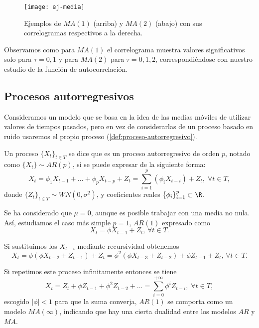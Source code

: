 \begin{figure}[htpb]
  \centering
  \texttt{[image: ej-media]}
  \caption{Ejemplos de $MA(1)$ (arriba) y $MA(2)$ (abajo) con sus correlogramas respectivos a la derecha.}
  \label{fig:ej-media}
\end{figure}

Observamos como para $MA(1)$ el correlograma muestra valores significativos solo para $\tau = 0, 1$ y para $MA(2)$ para $\tau = 0, 1, 2$, correspondiéndose con nuestro estudio de la función de autocorrelación.

\subsection{Procesos autorregresivos}

Consideramos un modelo que se basa en la idea de las medias móviles de utilizar valores de tiempos pasados, pero en vez de considerarlas de un proceso basado en ruido usaremos el propio proceso (\autoref{def:proceso-autorregresivo}).

\begin{definicion}
  Un proceso $\{X_t\}_{t \in T}$ se dice que es un proceso autorregresivo de orden $p$, notado como $\{X_t\} \sim AR(p)$, si se puede expresar de la siguiente forma:
  $$X_t = \phi_1 X_{t-1} + \ldots + \phi_p X_{t - p} + Z_t = \sum \limits^p_{i = 1} \left(\phi_i X_{t - i}\right) + Z_t, \; \forall t \in T,$$
  donde $\{Z_t\}_{t \in T} \sim WN(0, \sigma^2)$, y coeficientes reales $\{\phi_i\}_{i = 1}^p \subset \R$.
  \label{def:proceso-autorregresivo}
\end{definicion}

Se ha considerado que $\mu = 0$, aunque es posible trabajar con una media no nula. Así, estudiamos el caso más simple $p = 1$, $AR(1)$ expresado como
\begin{equation}
  X_t = \phi X_{t - 1} + Z_t, \, \forall t \in T.
  \label{eq:ar-simple}
\end{equation}

Si sustituimos los $X_{t - i}$ mediante recursividad obtenemos
\begin{equation*}
  X_t = \phi\left(\phi X_{t-2} + Z_{t-1}\right) + Z_t = \phi^2\left(\phi X_{t-3} + Z_{t-2}\right) + \phi Z_{t-1} + Z_t, \, \forall t \in T.
  \label{eq:ar-simple2}
\end{equation*}

Si repetimos este proceso infinitamente entonces se tiene
\begin{equation*}
  X_t = Z_t + \phi Z_{t-1} + \phi^2 Z_{t-2} + \ldots = \sum \limits^{+\infty}_{i = 0} \phi^i Z_{t - i}, \; \forall t \in T,
  \label{eq:ar-simple3}
\end{equation*}
escogido $|\phi| < 1$ para que la suma converja, $AR(1)$ se comporta como un modelo $MA(\infty)$, indicando que hay una cierta dualidad entre los modelos $AR$ y $MA$.

